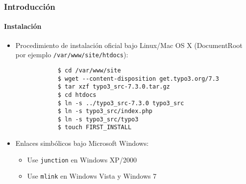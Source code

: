 \begin{frame}[fragile]
	\frametitle{Introducción}
	\framesubtitle{Instalación}

	\begin{itemize}
		\item Procedimiento de instalación oficial bajo Linux/Mac OS X\newline
			(DocumentRoot por ejemplo \texttt{/var/www/site/htdocs}):
		\begin{lstlisting}
			$ cd /var/www/site
			$ wget --content-disposition get.typo3.org/7.3
			$ tar xzf typo3_src-7.3.0.tar.gz
			$ cd htdocs
			$ ln -s ../typo3_src-7.3.0 typo3_src
			$ ln -s typo3_src/index.php
			$ ln -s typo3_src/typo3
			$ touch FIRST_INSTALL
		\end{lstlisting}

		\item Enlaces simbólicos bajo Microsoft Windows:

			\begin{itemize}
				\item Use \texttt{junction} en Windows XP/2000
				\item Use \texttt{mlink} en Windows Vista y Windows 7
			\end{itemize}

	\end{itemize}
\end{frame}

